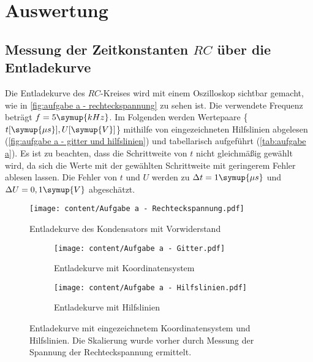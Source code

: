 \section{Auswertung}
\label{sec:Auswertung}
\subsection{Messung der Zeitkonstanten $RC$ über die Entladekurve}
Die Entladekurve des $RC$-Kreises wird mit einem Oszilloskop sichtbar gemacht, wie 
in \autoref{fig:aufgabe a - rechteckspannung} zu sehen ist. Die verwendete Frequenz beträgt $f=5\symup{kHz}$.
Im Folgenden werden Wertepaare \{$t [\symup{\mu s}], U [\symup{V}]$\} mithilfe von eingezeichneten Hilfslinien abgelesen
(\autoref{fig:aufgabe a - gitter und hilfslinien}) und tabellarisch aufgeführt (\autoref{tab:aufgabe a}). Es ist zu beachten,
dass die Schrittweite von $t$ nicht gleichmäßig gewählt wird, da sich die Werte mit der gewählten Schrittweite mit
geringerem Fehler ablesen lassen. Die Fehler von $t$ und $U$ werden zu
 $\Delta t = 1\symup{\mu s}$ und $\Delta U = 0,1\symup{V}$ abgeschätzt.

\begin{figure}
  \centering
  \texttt{[image: content/Aufgabe a - Rechteckspannung.pdf]}
  \caption{Entladekurve des Kondensators mit Vorwiderstand}
  \label{fig:aufgabe a - rechteckspannung}
\end{figure}

\begin{figure}
  \begin{subfigure}{0.48\textwidth}
    \centering
    \texttt{[image: content/Aufgabe a - Gitter.pdf]}
    \caption{Entladekurve mit Koordinatensystem}
    \label{fig:aufgabe a - gitter}
  \end{subfigure}
  \hfill
  \begin{subfigure}{0.48\textwidth}
    \centering
    \texttt{[image: content/Aufgabe a - Hilfslinien.pdf]}
    \caption{Entladekurve mit Hilfslinien}
    \label{fig:aufgabe a - hilfslinien}
  \end{subfigure}
  \caption{Entladekurve mit eingezeichnetem Koordinatensystem und Hilfslinien. Die %
    Skalierung wurde vorher durch Messung der Spannung der Rechteckspannung ermittelt.}
  \label{fig:aufgabe a - gitter und hilfslinien}
\end{figure}

